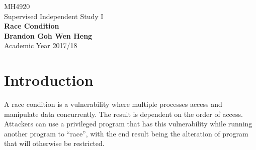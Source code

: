 \documentclass[a4paper,12pt]{article}
\begin{document}
	\begin{titlepage}
		\begin{center}
			\vspace*{9em}
			\Huge 
			MH4920\\ Supervised Independent Study I\\
			\vspace*{4em}
			\LARGE
			\textbf{Race Condition\\}		
			\vspace{4em}
			\textbf{Brandon Goh Wen Heng}\\
			\vspace*{4em}
			Academic Year 2017/18
			\vfill
		\end{center}
	\end{titlepage}
	
	\tableofcontents
	\newpage
	\section{Introduction}
	A race condition is a vulnerability where multiple processes access and manipulate data concurrently. The result is dependent on the order of access. Attackers  can use a privileged program that has this vulnerability while running another program to ``race'', with the end result being the alteration of program that will otherwise be restricted.
\end{document}
